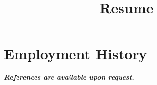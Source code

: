 \documentclass[12pt,a4paper]{moderncv}
\title{Resume}
\begin{document}
\maketitle





\clearpage


\clearpage


%



%

\section{Employment History}











\emph{\textbf{References are available upon request.}}


\end{document}
